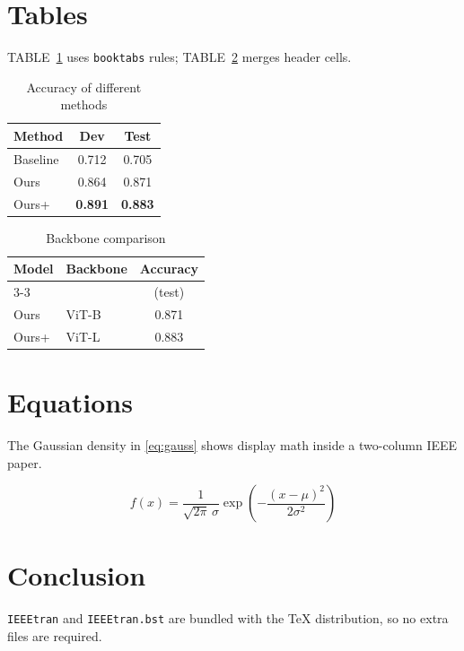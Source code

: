 \documentclass[conference]{IEEEtran}
\begin{document}
\section{Tables}
TABLE~\ref{tab:main} uses \texttt{booktabs} rules;
TABLE~\ref{tab:merged} merges header cells.

\begin{table}[!t]
  \renewcommand{\arraystretch}{1.2}
  \caption{Accuracy of different methods}
  \label{tab:main}
  \centering
  \begin{tabular}{lcc}
    \toprule
    Method & Dev & Test \\
    \midrule
    Baseline & 0.712 & 0.705 \\
    Ours     & 0.864 & 0.871 \\
    Ours+    & \textbf{0.891} & \textbf{0.883} \\
    \bottomrule
  \end{tabular}
\end{table}

\begin{table}[!t]
  \renewcommand{\arraystretch}{1.2}
  \caption{Backbone comparison}
  \label{tab:merged}
  \centering
  \begin{tabular}{llc}
    \toprule
    \multirow{2}{*}{Model} & \multirow{2}{*}{Backbone} & Accuracy \\
    \cmidrule(l){3-3}
     & & (test) \\
    \midrule
    Ours  & ViT-B & 0.871 \\
    Ours+ & ViT-L & 0.883 \\
    \bottomrule
  \end{tabular}
\end{table}

\section{Equations}
The Gaussian density in \eqref{eq:gauss} shows display math inside a
two-column IEEE paper.

\begin{equation}
  f(x)=\frac{1}{\sqrt{2\pi}\,\sigma}
  \exp\!\left(-\frac{(x-\mu)^2}{2\sigma^2}\right)
  \label{eq:gauss}
\end{equation}

\section{Conclusion}
\texttt{IEEEtran} and \texttt{IEEEtran.bst} are bundled with the TeX
distribution, so no extra files are required.



\end{document}
